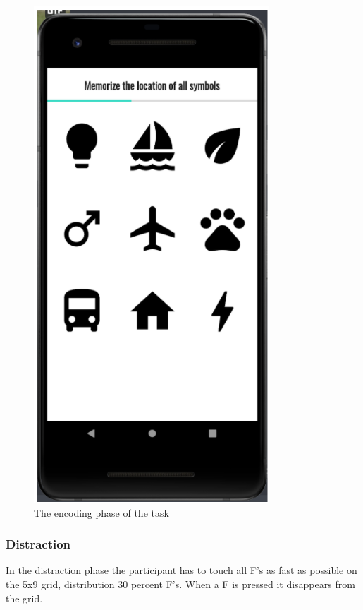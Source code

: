 \documentclass{article}
\begin{document}
\begin{figure}[H]
  \begin{center}
    \includegraphics[scale=0.7]{Android4.png}
    \caption{The encoding phase of the task
}
    \label{fig:android4}
  \end{center}
\end{figure}

\subsubsection{Distraction}
In the distraction phase the participant has to touch all F’s as fast as possible
on the 5x9 grid, distribution 30 percent F’s. When a F is pressed it disappears from the grid.
\end{document}
